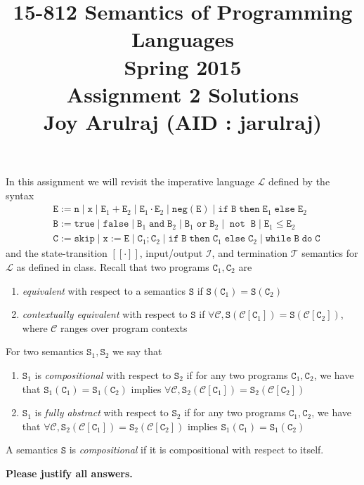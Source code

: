 \documentclass{article}
\newcommand{\E}{\mathtt{E}}
\newcommand{\B}{\mathtt{B}}
\newcommand{\C}{\mathtt{C}}
\newcommand{\true}{\mathtt{true}}
\newcommand{\false}{\mathtt{false}}
\newcommand{\andsym}{\mathtt{and}}
\newcommand{\orsym}{\mathtt{or}}
\newcommand{\notsym}{\mathop{\mathtt{not}}}
\newcommand{\ifsym}{\mathtt{if}}
\newcommand{\then}{\mathtt{then}}
\newcommand{\elsesym}{\mathtt{else}}
\newcommand{\whilesym}{\mathtt{while}}
\newcommand{\dosym}{\mathtt{do}}
\newcommand{\skipsym}{\mathtt{skip}}
\newcommand{\negation}{\mathtt{neg}}
\newcommand{\Sem}{\mathtt{S}}
\newcommand{\question}[1]
{\color{DarkBlue}#1 \color{Black}}
\begin{document}
\title{\textbf{15-812 Semantics of Programming Languages \\ Spring 2015 \\
{\large Assignment 2 Solutions}}\\\vspace{0.3in}
{\Large \bf Joy Arulraj (AID : jarulraj)}}

\date{}
\author{}

\maketitle

\question{
\noindent In this assignment we will revisit the imperative language $\mathcal{L}$ defined by the syntax
\begin{align*}
& \E := \mathtt{n} \; | \; \mathtt{x} \; | \; \E_1 + \E_2 \; | \; \E_1 \cdot \E_2 \; | \; \negation(\E) \; | \; \ifsym \; \B \; \then \; \E_1 \; \elsesym \; \E_2 \\ 
& \B := \true \; | \; \false \; | \; \B_1 \; \andsym \; \B_2 \; | \; \B_1 \; \orsym \; \B_2 \; | \; \notsym \; \B \; | \; \E_1 \leq \E_2 \\
& \C := \skipsym \; | \; \mathtt{x} := \E \; | \; \C_1 ; \C_2 \; | \; \ifsym \; \B \; \then \; \C_1 \; \elsesym \; \C_2 \; | \; \whilesym \; \B \; \dosym \; \C
\end{align*}
and the state-transition $[[\cdot]]$, input/output $\mathcal{I}$, and termination $\mathcal{T}$ semantics for $\mathcal{L}$ as defined in class. Recall that two programs $\C_1, \C_2$ are 

\begin{enumerate}

\item \emph{equivalent} with respect to a semantics $\Sem$ 
if $\Sem(\C_1) = \Sem(\C_2)$
\item \emph{contextually equivalent} with respect to $\Sem$ 
if $\forall \mathcal{C}, \Sem(\mathcal{C}[\C_1]) = \Sem(\mathcal{C}[\C_2])$, where $\mathcal{C}$ ranges over program contexts

\end{enumerate}

For two semantics $\Sem_1, \Sem_2$ we say that
\begin{enumerate}
	\item $\Sem_1$ is \emph{compositional} with respect to $\Sem_2$ if for any two programs $\C_1,\C_2$, 
	we have that $\Sem_1(\C_1) = \Sem_1(\C_2)$ implies $\forall \mathcal{C}, \Sem_2(\mathcal{C}[\C_1]) = \Sem_2(\mathcal{C}[\C_2])$

	\item $\Sem_1$ is \emph{fully abstract} with respect to $\Sem_2$ if for any two programs $\C_1,\C_2$, 
	we have that $\forall \mathcal{C}, \Sem_2(\mathcal{C}[\C_1]) = \Sem_2(\mathcal{C}[\C_2])$ implies $\Sem_1(\C_1) = \Sem_1(\C_2)$
	\end{enumerate}
	A semantics $\Sem$ is \emph{compositional} if it is compositional with respect to itself.\bigskip

\noindent \textbf{Please justify all answers.}
}
\end{document}
